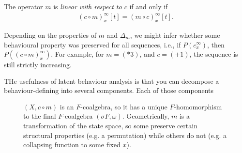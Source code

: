 \begin{definition}[Latent Coalgebra]
\begin{definition}
The operator $m$ is \emph{linear with respect to $c$} if and only if
\begin{align}
    (c\circ m)^\infty_x[t]= (m \circ c)^\infty_x[t].
\end{align}    
\end{definition}


Depending on the properties of $m$ and $\Delta_m$, we might infer whether some behavioural property was preserved for all sequences, i.e., if $P(c^\infty_x)$, then $P((c\circ m)^\infty_x)$. For example, for $m=(*3)$, and $c=(+1)$, the sequence is still strictly increasing. 











THe usefulness of latent behaviour analysis is that you can decompose a behaviour-defining into several components. Each of those components 



\end{definition}
\begin{figure}
    \centering
    \caption{$(X,c\circ m)$ is an $F$-coalgebra, so it has a unique $F$-homomorphism to the final $F$-coalgebra $(\sigma F, \omega)$. Geometrically, $m$ is a transformation of the state space, so some preserve certain structural properties (e.g. a permutation) while others do not (e.g. a collapsing function to some fixed $x$).}
\end{figure}
